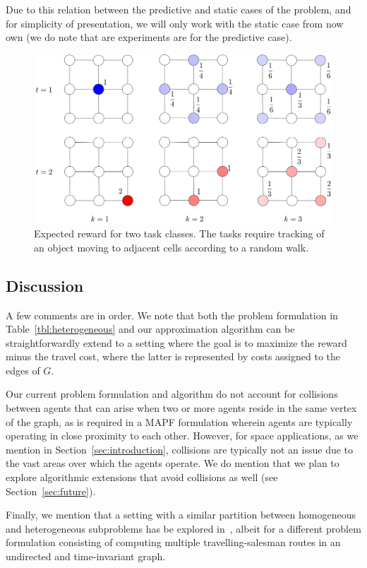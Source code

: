 \documentclass[conference]{IEEEtran}
\begin{document}
Due to this relation between the predictive and static cases of the problem, and for simplicity of presentation, we will only work with the static case from now own (we do note that are experiments are for the predictive case). 

\begin{figure}[h]
\centering
\includegraphics[width=.35\textwidth]{fig/distribution_and_reward.pdf}
\caption{Expected reward for two task classes. The tasks require tracking of an object moving to adjacent cells according to a random walk.}
\label{fig:distribution_and_reward}
\end{figure}

\subsection{Discussion}
A few comments are in order. We note that both the problem formulation in Table~\ref{tbl:heterogeneous} and our approximation algorithm can be straightforwardly extend to a setting where the goal is to maximize the reward minus the travel cost, where the latter is represented by costs assigned to the edges of $G$. 

Our current problem formulation and algorithm do not account for collisions between agents that can arise when two or more agents reside in the same vertex of the graph, as is required in a MAPF formulation wherein agents are typically operating in close proximity to each other. However, for space applications, as we mention in Section~\ref{sec:introduction}, collisions are typically not an issue due to the vast areas over which the agents operate. We do mention that we plan to explore algorithmic extensions that avoid collisions as well (see Section~\ref{sec:future}).

Finally, we mention that a setting with a similar partition between homogeneous and heterogeneous subproblems has be explored in~\cite{PrasadETAL20}, albeit for a different problem formulation consisting of computing multiple travelling-salesman routes in an undirected and time-invariant graph. %
\end{document}
